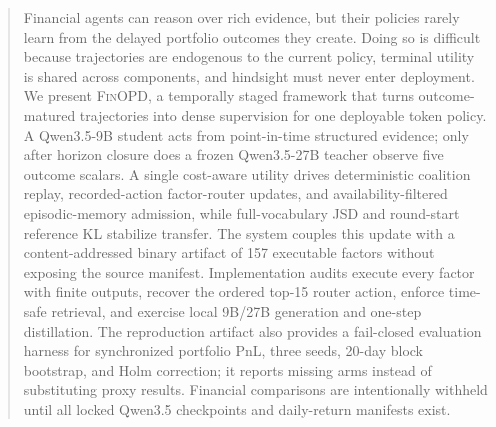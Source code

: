 \begin{abstract}
Financial agents can reason over rich evidence, but their policies rarely learn from the delayed portfolio outcomes they create. Doing so is difficult because trajectories are endogenous to the current policy, terminal utility is shared across components, and hindsight must never enter deployment. We present \textsc{FinOPD}, a temporally staged framework that turns outcome-matured trajectories into dense supervision for one deployable token policy. A Qwen3.5-9B student acts from point-in-time structured evidence; only after horizon closure does a frozen Qwen3.5-27B teacher observe five outcome scalars. A single cost-aware utility drives deterministic coalition replay, recorded-action factor-router updates, and availability-filtered episodic-memory admission, while full-vocabulary JSD and round-start reference KL stabilize transfer. The system couples this update with a content-addressed binary artifact of 157 executable factors without exposing the source manifest. Implementation audits execute every factor with finite outputs, recover the ordered top-15 router action, enforce time-safe retrieval, and exercise local 9B/27B generation and one-step distillation. The reproduction artifact also provides a fail-closed evaluation harness for synchronized portfolio PnL, three seeds, 20-day block bootstrap, and Holm correction; it reports missing arms instead of substituting proxy results. Financial comparisons are intentionally withheld until all locked Qwen3.5 checkpoints and daily-return manifests exist.
\end{abstract}
